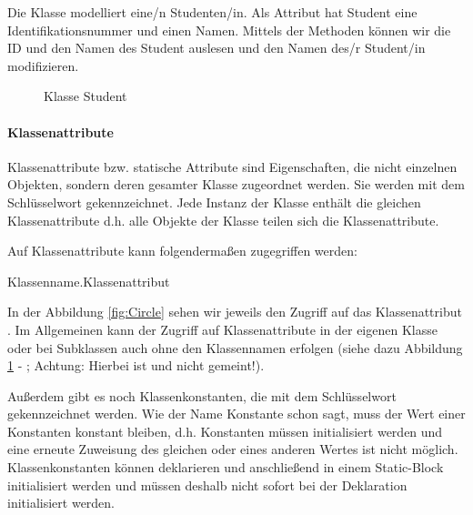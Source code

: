 \documentclass{tuda-pub}
\begin{document}
  \clearpage

  Die Klasse  modelliert eine/n Studenten/in. Als Attribut hat Student eine
  Identifikationsnummer und einen Namen. Mittels der Methoden können wir die ID und den Namen des
  Student auslesen und den Namen des/r Student/in modifizieren.

  \begin{figure}[h]
    \centering
    
    \caption{Klasse Student}
    \label{fig:Student}
  \end{figure}

  \paragraph{Klassenattribute}

  Klassenattribute bzw. statische Attribute sind Eigenschaften, die nicht einzelnen Objekten,
  sondern deren gesamter Klasse zugeordnet werden. Sie werden mit dem Schlüsselwort
   gekennzeichnet. Jede Instanz der Klasse enthält die gleichen
  Klassenattribute d.h. alle Objekte der Klasse teilen sich die Klassenattribute.

  \br

  Auf Klassenattribute kann folgendermaßen zugegriffen werden:

  \begin{center}
    Klassenname.Klassenattribut
  \end{center}

  In der Abbildung \ref{fig:Circle} sehen wir jeweils den Zugriff auf das Klassenattribut
  . Im Allgemeinen kann der Zugriff auf Klassenattribute in der eigenen Klasse
  oder bei Subklassen auch ohne den Klassennamen erfolgen (siehe dazu Abbildung \ref{fig:Student}
  -  ; Achtung: Hierbei ist  und nicht  gemeint!).

  \clearpage

  Außerdem gibt es noch Klassenkonstanten, die mit dem Schlüsselwort 
  gekennzeichnet werden. Wie der Name Konstante schon sagt, muss der Wert einer Konstanten
  konstant bleiben, d.h. Konstanten müssen initialisiert werden und eine erneute Zuweisung des
  gleichen oder eines anderen Wertes ist nicht möglich. Klassenkonstanten können deklarieren und
  anschließend in einem Static-Block initialisiert werden und müssen deshalb nicht sofort bei der
  Deklaration initialisiert werden.
\end{document}
